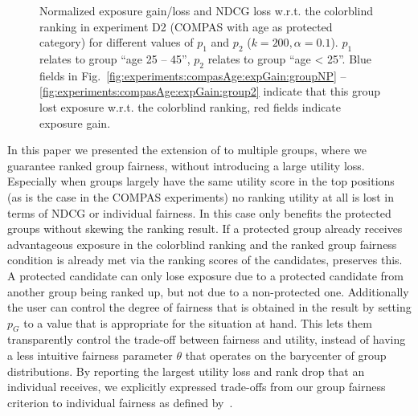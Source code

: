 \begin{figure}[t!]
	\vspace{-3mm}
	\caption{Normalized exposure gain/loss and NDCG loss w.r.t. the colorblind ranking in experiment D2 (COMPAS with age as protected category) for different values of $p_1$ and $p_2$ ($k=200, \alpha=0.1$).
		$p_1$ relates to group ``age 25 -- 45'', $p_2$ relates to group ``age < 25''.
		Blue fields in Fig.~\ref{fig:experiments:compasAge:expGain:groupNP} -- \ref{fig:experiments:compasAge:expGain:group2} indicate that this group lost exposure w.r.t. the colorblind ranking, red fields indicate exposure gain.
	}
	\label{fig:results-moving-p}
\end{figure}

In this paper we presented the extension of \algoFAIR to multiple groups, where we guarantee ranked group fairness, without introducing a large utility loss.
%
Especially when groups largely have the same utility score in the top positions (as is the case in the COMPAS experiments) no ranking utility at all is lost in terms of NDCG or individual fairness.
%
In this case \algoFAIR only benefits the protected groups without skewing the ranking result.
%
If a protected group already receives advantageous exposure in the colorblind ranking and the ranked group fairness condition is already met via the ranking scores of the candidates, \algoFAIR preserves this.
%
A protected candidate can only lose exposure due to a protected candidate from another group being ranked up, but not due to a non-protected one.
%
Additionally the user can control the degree of fairness that is obtained in the result by setting $p_G$ to a value that is appropriate for the situation at hand.
%
This lets them transparently control the trade-off between fairness and utility, instead of having a less intuitive fairness parameter $\theta$ that operates on the barycenter of group distributions.
%
By reporting the largest utility loss and rank drop that an individual receives, we explicitly expressed trade-offs from our group fairness criterion to individual fairness as defined by~\citet{Dwork2012}. 

